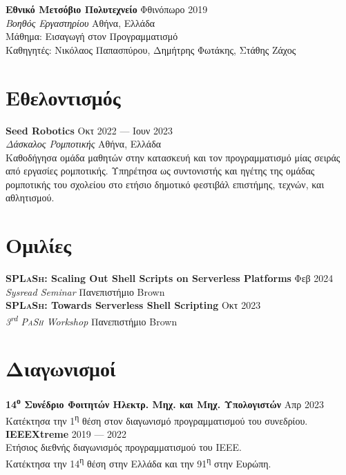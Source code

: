 \documentclass[margin, 12pt]{resume}
\newcommand{\splash}{\textsc{SPLaSh}\xspace}
\newcommand{\sectionVSpace}{\vspace{-3.5ex}} %
\newcommand{\competition}[1]{\textbf{#1}\xspace}
\newcommand{\event}[1]{\textit{#1}\xspace}
\newcommand{\institution}[1]{\textbf{#1}\xspace}
\newcommand{\ordinal}[1]{\textsuperscript{#1}\xspace}
\newcommand{\rSection}[1]{\sectionVSpace\section{#1}\xspace}
\newcommand{\role}[1]{\textit{#1}\xspace}
\newcommand{\stitle}[1]{#1:\xspace}
\newcommand{\talk}[1]{\textbf{#1}\xspace}
\begin{document}
\begin{resume}
    \institution{Εθνικό Μετσόβιο Πολυτεχνείο} \hfill Φθινόπωρο 2019 \\
    \role{Βοηθός Εργαστηρίου} \hfill Αθήνα, Ελλάδα \\
    \stitle{Μάθημα} Εισαγωγή στον Προγραμματισμό \\
    \stitle{Καθηγητές} Νικόλαος Παπασπύρου, Δημήτρης Φωτάκης, Στάθης Ζάχος \\

    \rSection{Εθελοντισμός}

    \institution{Seed Robotics} \hfill Οκτ 2022 --- Ιουν 2023 \\
    \role{Δάσκαλος Ρομποτικής} \hfill Αθήνα, Ελλάδα \\
    Καθοδήγησα ομάδα μαθητών στην κατασκευή και τον προγραμματισμό μίας σειράς από εργασίες ρομποτικής. Υπηρέτησα ως συντονιστής και ηγέτης της ομάδας ρομποτικής του σχολείου στο ετήσιο δημοτικό φεστιβάλ επιστήμης, τεχνών, και αθλητισμού. \\

    \rSection{Ομιλίες}


    \talk{\splash: Scaling Out Shell Scripts on Serverless Platforms} \hfill Φεβ 2024 \\
    \event{Sysread Seminar} \hfill Πανεπιστήμιο Brown \\


    \talk{\splash: Towards Serverless Shell Scripting} \hfill Οκτ 2023 \\
    \event{3\ordinal{rd} \textsc{PaSh} Workshop} \hfill Πανεπιστήμιο Brown \\

    \rSection{Διαγωνισμοί}

    \competition{14\ordinal{ο} Συνέδριο Φοιτητών Ηλεκτρ. Μηχ. και Μηχ. Υπολογιστών} \hfill Απρ 2023 \\
    Κατέκτησα την 1\ordinal{η} θέση στον διαγωνισμό προγραμματισμού του συνεδρίου. \\

    \competition{IEEEXtreme} \hfill 2019 --- 2022 \\
    Ετήσιος διεθνής διαγωνισμός προγραμματισμού του IEEE. \\
    Κατέκτησα την 14\ordinal{η} θέση στην Ελλάδα και την 91\ordinal{η} στην Ευρώπη. \\


\end{resume}
\end{document}
